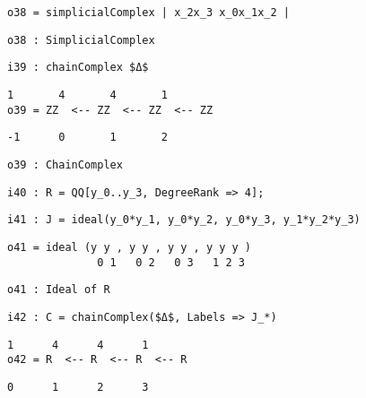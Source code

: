 \documentclass[12pt,leqno]{amsart}
\theoremstyle{definition}
\begin{document}
\begin{lstlisting}[xleftmargin=10pt, aboveskip=1.5pt, belowskip=1.5pt]
o38 = simplicialComplex | x_2x_3 x_0x_1x_2 |
\end{lstlisting}
\begin{lstlisting}[xleftmargin=10pt, aboveskip=1.5pt, belowskip=1.5pt]
o38 : SimplicialComplex
\end{lstlisting}
\begin{lstlisting}[xleftmargin=10pt, aboveskip=1.5pt, belowskip=1.5pt]
i39 : chainComplex $Δ$
\end{lstlisting}
\begin{lstlisting}[xleftmargin=10pt, lineskip=-10pt, aboveskip=1.5pt, belowskip=1.5pt]
        1       4       4       1
o39 = ZZ  <-- ZZ  <-- ZZ  <-- ZZ
\end{lstlisting}
\begin{lstlisting}[xleftmargin=10pt, aboveskip=1.5pt, belowskip=1.5pt]
      -1      0       1       2
\end{lstlisting}
\begin{lstlisting}[xleftmargin=10pt, aboveskip=1.5pt, belowskip=1.5pt]
o39 : ChainComplex
\end{lstlisting}
\begin{lstlisting}[xleftmargin=10pt, aboveskip=1.5pt, belowskip=1.5pt]
i40 : R = QQ[y_0..y_3, DegreeRank => 4];
\end{lstlisting}
\begin{lstlisting}[xleftmargin=10pt, aboveskip=1.5pt, belowskip=1.5pt]
i41 : J = ideal(y_0*y_1, y_0*y_2, y_0*y_3, y_1*y_2*y_3)
\end{lstlisting}
\begin{lstlisting}[xleftmargin=10pt, lineskip=-10pt, aboveskip=1.5pt, belowskip=1.5pt]
o41 = ideal (y y , y y , y y , y y y )
              0 1   0 2   0 3   1 2 3
\end{lstlisting}
\begin{lstlisting}[xleftmargin=10pt, aboveskip=1.5pt, belowskip=1.5pt]
o41 : Ideal of R
\end{lstlisting}
\begin{lstlisting}[xleftmargin=10pt, aboveskip=1.5pt, belowskip=1.5pt]
i42 : C = chainComplex($Δ$, Labels => J_*)
\end{lstlisting}
\begin{lstlisting}[xleftmargin=10pt, lineskip=-10pt, aboveskip=1.5pt, belowskip=1.5pt]
       1      4      4      1
o42 = R  <-- R  <-- R  <-- R
\end{lstlisting}
\begin{lstlisting}[xleftmargin=10pt, aboveskip=1.5pt, belowskip=1.5pt]                           
      0      1      2      3
\end{lstlisting}
\end{document}
